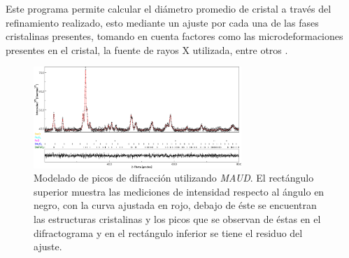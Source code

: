 \documentclass[../main.tex]{subfiles}
\begin{document}
Este programa permite calcular el diámetro promedio de cristal a través del refinamiento realizado, esto mediante un ajuste por cada una de las fases cristalinas presentes, tomando en cuenta factores como las microdeformaciones presentes en el cristal, la fuente de rayos X utilizada, entre otros \cite{LucaLutterotti2006}.
\begin{figure}[H]
    \centering
    \includegraphics[width=0.7\textwidth]{fig/Rietveld.png}
    \caption{Modelado de picos de difracción utilizando \textit{MAUD}. El rectángulo superior muestra las mediciones de intensidad respecto al ángulo en negro, con la curva ajustada en rojo, debajo de éste se encuentran las estructuras cristalinas y los picos que se observan de éstas en el difractograma y en el rectángulo inferior se tiene el residuo del ajuste.}
    \label{fig:picosrietveld}
\end{figure}
\end{document}
